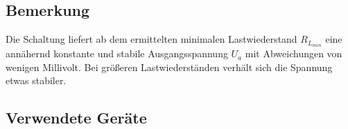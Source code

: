 \documentclass[a4paper]{hitec}
\begin{document}
\subsection{Bemerkung}

Die Schaltung liefert ab dem ermittelten minimalen Lastwiederstand $R_{L_{min}}$ eine annähernd konstante und stabile Ausgangsspannung $U_a$ mit Abweichungen von wenigen Millivolt.
Bei größeren Lastwiederständen verhält sich die Spannung etwas stabiler.

\clearpage

\subsection{Verwendete Geräte}

\medskip

\begin{devicelist}
\end{devicelist}

\vfill

\IncludeHistoryTimeline

\pagebreak




\end{document}
